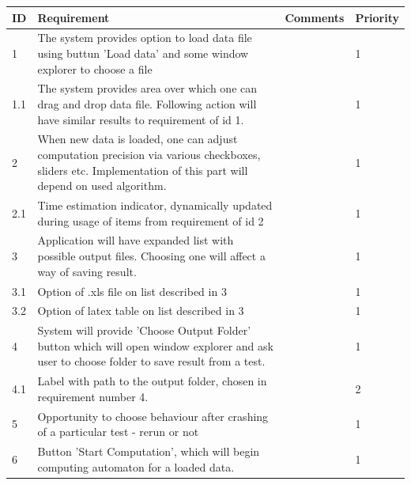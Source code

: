 \documentclass{article}
\begin{document}
\begin{center}
\hspace*{-2.1cm}
	\begin{longtable}{| l | p{4cm} | p{3.5cm} | l |}
	
		\hline
	  	ID & Requirement & Comments & Priority \\
		\hline
		
		1 & 
		The system provides option to load data file using buttun 'Load data' and
		some window explorer to choose a file & 
		 &
		1 
		\\ \hline
		
		1.1 & 
		The system provides area over which one can drag and drop data file.
		Following action will have similar results to requirement of id 1. & 
		 &
		1 
		\\ \hline		
	
		2 & 
		When new data is loaded, one can adjust computation precision via various checkboxes, 			sliders etc. Implementation of this part will depend on used algorithm. & 
		 &
		1 
		\\ \hline		
	
			2.1 & 
		Time estimation indicator, dynamically updated during usage of items from requirement 			of id 2 & 
		 &
		1 
		\\ \hline		
		
		3 & 
		Application will have expanded list with possible output files. Choosing one will 				affect a way of saving result. & 
		 &
		1 
		\\ \hline			

		3.1 & 
		Option of .xls file on list described in 3 & 
		 &
		1 
		\\ \hline		

		3.2 & 
		Option of latex table on list described in 3 & 
		 &
		1 
		\\ \hline	

		4 & 
		System will provide 'Choose Output Folder' button which will open window explorer and 			ask user to choose folder to save result from a test. & 
		 &
		1 
		\\ \hline	
	
		4.1 & 
		Label with path to the output folder, chosen in requirement number 4. & 
		 &
		2 
		\\ \hline		
		
		5 & 
		Opportunity to choose behaviour after crashing of a particular test - rerun or not & 
		 &
		1
		\\ \hline
		
		6 & 
		Button 'Start Computation', which will begin computing automaton for a loaded data. & 
		 &
		1
		\\ \hline		
		

\end{longtable}
\end{center}
\end{document}
